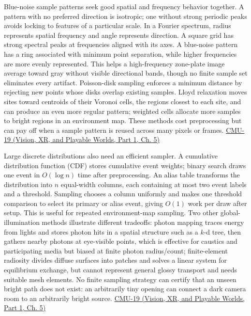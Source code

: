 Blue-noise sample patterns seek good spatial and frequency behavior together. A pattern with no preferred direction is isotropic; one without strong periodic peaks avoids locking to features of a particular scale. In a Fourier spectrum, radius represents spatial frequency and angle represents direction. A square grid has strong spectral peaks at frequencies aligned with its axes. A blue-noise pattern has a ring associated with minimum point separation, while higher frequencies are more evenly represented. This helps a high-frequency zone-plate image average toward gray without visible directional bands, though no finite sample set eliminates every artifact. Poisson-disk sampling enforces a minimum distance by rejecting new points whose disks overlap existing samples. Lloyd relaxation moves sites toward centroids of their Voronoi cells, the regions closest to each site, and can produce an even more regular pattern; weighted cells allocate more samples to bright regions in an environment map. These methods cost preprocessing but can pay off when a sample pattern is reused across many pixels or frames. \href{../07-Vision-XR-and-Playable-Worlds-P01/main.pdf\#nameddest=04-visual-computing-ii-ch036-cmu-19---variance-reduction}{CMU-19 (Vision, XR, and Playable Worlds, Part 1, Ch. 5)}

Large discrete distributions also need an efficient sampler. A cumulative distribution function (CDF) stores cumulative event weights; binary search draws one event in \(O(\log n)\) time after preprocessing. An alias table transforms the distribution into \(n\) equal-width columns, each containing at most two event labels and a threshold. Sampling chooses a column uniformly and makes one threshold comparison to select its primary or alias event, giving \(O(1)\) work per draw after setup. This is useful for repeated environment-map sampling. Two other global-illumination methods illustrate different tradeoffs: photon mapping traces energy from lights and stores photon hits in a spatial structure such as a \(k\)-d tree, then gathers nearby photons at eye-visible points, which is effective for caustics and participating media but biased at finite photon radius/count; finite-element radiosity divides diffuse surfaces into patches and solves a linear system for equilibrium exchange, but cannot represent general glossy transport and needs suitable mesh elements. No finite sampling strategy can certify that an unseen bright path does not exist: an arbitrarily tiny opening can connect a dark camera room to an arbitrarily bright source. \href{../07-Vision-XR-and-Playable-Worlds-P01/main.pdf\#nameddest=04-visual-computing-ii-ch036-cmu-19---variance-reduction}{CMU-19 (Vision, XR, and Playable Worlds, Part 1, Ch. 5)}


